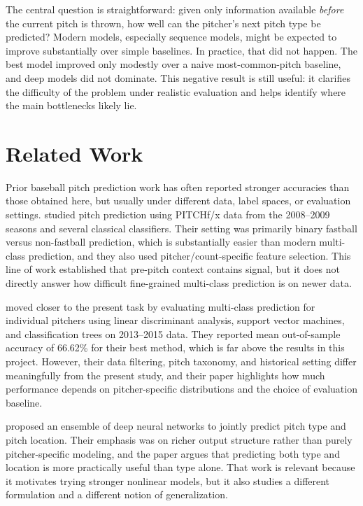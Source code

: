 \documentclass{article}
\begin{document}
The central question is straightforward: given only information available \emph{before} the current pitch is thrown, how well can the pitcher's next pitch type be predicted? Modern models, especially sequence models, might be expected to improve substantially over simple baselines. In practice, that did not happen. The best model improved only modestly over a naive most-common-pitch baseline, and deep models did not dominate. This negative result is still useful: it clarifies the difficulty of the problem under realistic evaluation and helps identify where the main bottlenecks likely lie.

\section{Related Work}
Prior baseball pitch prediction work has often reported stronger accuracies than those obtained here, but usually under different data, label spaces, or evaluation settings. \citet{hamilton2014applying} studied pitch prediction using PITCHf/x data from the 2008--2009 seasons and several classical classifiers. Their setting was primarily binary fastball versus non-fastball prediction, which is substantially easier than modern multi-class prediction, and they also used pitcher/count-specific feature selection. This line of work established that pre-pitch context contains signal, but it does not directly answer how difficult fine-grained multi-class prediction is on newer data.

\citet{sidle2018multiclass} moved closer to the present task by evaluating multi-class prediction for individual pitchers using linear discriminant analysis, support vector machines, and classification trees on 2013--2015 data. They reported mean out-of-sample accuracy of 66.62\% for their best method, which is far above the results in this project. However, their data filtering, pitch taxonomy, and historical setting differ meaningfully from the present study, and their paper highlights how much performance depends on pitcher-specific distributions and the choice of evaluation baseline.

\citet{lee2022ensemble} proposed an ensemble of deep neural networks to jointly predict pitch type and pitch location. Their emphasis was on richer output structure rather than purely pitcher-specific modeling, and the paper argues that predicting both type and location is more practically useful than type alone. That work is relevant because it motivates trying stronger nonlinear models, but it also studies a different formulation and a different notion of generalization.
\end{document}
